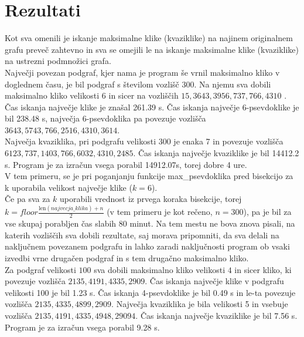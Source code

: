 \documentclass[12pt,a4paper]{amsart}
\theoremstyle{definition}
\theoremstyle{plain}
\begin{document}
\section{Rezultati}

Kot sva omenili je iskanje maksimalne klike (kvaziklike) na najinem originalnem grafu preveč zahtevno in sva se omejili le na iskanje maksimalne klike (kvaziklike) na ustrezni podmnožici grafa.\\

Največji povezan podgraf, kjer nama je program še vrnil maksimalno kliko v doglednem času, je bil podgraf s številom vozlišč $300$. Na njemu sva dobili maksimalno kliko velikosti $6$ in sicer na vozliščih $15, 3643, 3956, 737, 766, 4310$ . Čas iskanja največje klike je znašal 261.39 s. Čas iskanja največje 6-psevdoklike je bil 238.48 s, največja 6-psevdoklika pa povezuje vozlišča $3643, 5743, 766, 2516, 4310, 3614$. \\Največja kvaziklika, pri podgrafu velikosti 300 je enaka 7 in povezuje vozlišča \\$6123, 737, 1403, 766, 6032, 4310, 2485$. Čas iskanja največje kvaziklike je bil 14412.2 s. Program je za izračun vsega porabil 14912.07s, torej dobre 4 ure.\\
V tem primeru, se je pri poganjanju funkcije max\_psevdoklika pred bisekcijo za k uporabila velikost največje klike ($k = 6$).
\\

Če pa sva za $k$ uporabili vrednost iz prvega koraka bisekcije, torej $k = floor\frac{\mathrm{len}(najvecja\_klika) + n}{2}$ (v tem primeru je kot rečeno, $n = 300$), pa je bil za vse skupaj porabljen čas slabih 80 minut. Na tem mestu ne bova znova pisali, na katerih vozliščih sva dobili rezultate, saj morava pripomniti, da sva delali na naključnem povezanem podgrafu in lahko zaradi naključnosti program ob vsaki izvedbi vrne drugačen podgraf in s tem drugačno maksimalno kliko.\\

Za podgraf velikosti $100$ sva dobili maksimalno kliko velikosti $4$ in sicer kliko, ki povezuje vozlišča $2135, 4191, 4335, 2909$. Čas iskanja največje klike v podgrafu velikosti 100 je bil 1.23 s. Čas iskanja 4-psevdoklike je bil 0.49 s in le-ta povezuje vozlišča $2135, 4335, 4899, 2909$.
Največja kvaziklika je bila velikosti 5 in vsebuje vozlišča $2135, 4191, 4335, 4948, 29094$. Čas iskanja največje kvaziklike je bil 7.56 s. Program je za izračun vsega porabil 9.28 s. 
\\
\end{document}
